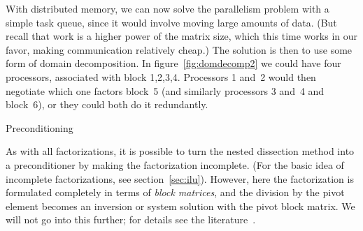 With distributed memory, we can now solve the parallelism problem with
a simple task queue, since it would involve moving large amounts of
data. (But recall that work is a higher power of the matrix size,
which this time works in our favor, making communication relatively
cheap.) The solution is then to use some form of domain
decomposition. In figure~\ref{fig:domdecomp2} we could have four
processors, associated with block 1,2,3,4. Processors 1 and~2 would
then negotiate which one factors block~5 (and similarly processors 3
and~4 and block~6), or they could both do it redundantly.

 {Preconditioning}

As with all factorizations, it is possible to turn the nested
dissection method into a preconditioner by making the factorization
incomplete. (For the basic idea of incomplete factorizations, see
section~\ref{sec:ilu}). However, here the factorization is formulated
completely in terms of \emph{block matrices}, and
the division by the pivot element becomes an inversion or system
solution with the pivot block matrix. We will not go into this
further; for details see the
literature~\cite{AxPo:dd2,Eij:general,Me:dd}.


